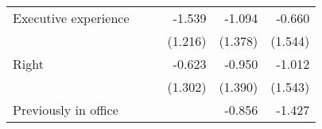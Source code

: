 \begin{table}[h!]
{\begin{threeparttable}
\begin{tabular}{l*{5}{D{.}{.}{-1}}}
Executive experience           &                     &                     &      -1.539         &      -1.094         &      -0.660         \\
&                     &                     &     (1.216)         &     (1.378)         &     (1.544)         \\
Right               &                     &                     &      -0.623         &      -0.950         &      -1.012         \\
&                     &                     &     (1.302)         &     (1.390)         &     (1.543)         \\
Previously in office           &                     &                     &                     &      -0.856         &      -1.427         \\

\end{tabular}
\end{threeparttable}}
\end{table}
